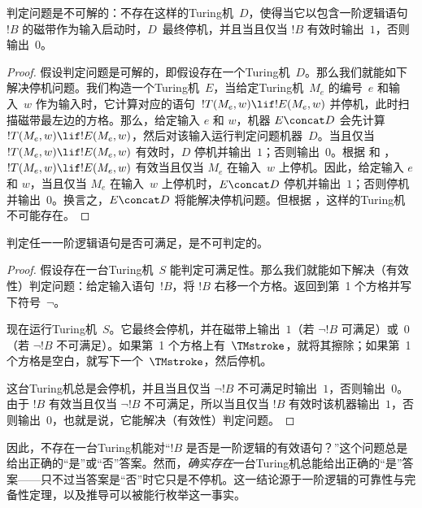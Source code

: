 \documentclass[../../../include/open-logic-section]{subfiles}
\begin{document}

\begin{thm}
判定问题是不可解的：不存在这样的Turing机~$D$，使得当它以包含一阶逻辑语句~$!B$ 的磁带作为输入启动时，$D$~最终停机，并且当且仅当 $!B$ 有效时输出~$1$，否则输出~$0$。
\end{thm}

\begin{proof}
假设判定问题是可解的，即假设存在一个Turing机~$D$。那么我们就能如下解决停机问题。我们构造一个Turing机~$E$，当给定Turing机~$M_e$ 的编号~$e$ 和输入~$w$ 作为输入时，它计算对应的语句~$!T(M_e, w) \lif !E(M_e, w)$ 并停机，此时扫描磁带最左边的方格。那么，给定输入 $e$ 和 $w$，机器 $E \concat D$ 会先计算~$!T(M_e, w) \lif
!E(M_e, w)$，然后对该输入运行判定问题机器~$D$。当且仅当 $!T(M_e, w) \lif !E(M_e, w)$ 有效时，$D$ 停机并输出~$1$；否则输出~$0$。根据  和 ，$!T(M_e, w) \lif !E(M_e, w)$ 有效当且仅当 $M_e$ 在输入~$w$ 上停机。因此，给定输入 $e$ 和 $w$，当且仅当 $M_e$ 在输入~$w$ 上停机时，$E\concat D$ 停机并输出~$1$；否则停机并输出~$0$。换言之，$E \concat D$ 将能解决停机问题。但根据 ，这样的Turing机不可能存在。
\end{proof}

\begin{cor}%
判定任一一阶逻辑语句是否可满足，是不可判定的。
\end{cor}

\begin{proof}
  假设存在一台Turing机~$S$ 能判定可满足性。那么我们就能如下解决（有效性）判定问题：给定输入语句~$!B$，将 $!B$ 右移一个方格。返回到第~1 个方格并写下符号~$\lnot$。

  现在运行Turing机~$S$。它最终会停机，并在磁带上输出~$1$（若 $\lnot !B$ 可满足）或~$0$（若 $\lnot !B$ 不可满足）。如果第~1 个方格上有~$\TMstroke$，就将其擦除；如果第~1 个方格是空白，就写下一个~$\TMstroke$，然后停机。

  这台Turing机总是会停机，并且当且仅当 $\lnot !B$ 不可满足时输出~$1$，否则输出~$0$。由于 $!B$ 有效当且仅当 $\lnot !B$ 不可满足，所以当且仅当 $!B$ 有效时该机器输出~$1$，否则输出~$0$，也就是说，它能解决（有效性）判定问题。
\end{proof}

\begin{explain}
因此，不存在一台Turing机能对“$!B$ 是否是一阶逻辑的有效语句？”这个问题总是给出正确的“是”或“否”答案。然而，\emph{确实存在}一台Turing机总能给出正确的“是”答案——只不过当答案是“否”时它只是不停机。这一结论源于一阶逻辑的可靠性与完备性定理，以及推导可以被能行枚举这一事实。
\end{explain}
\end{document}

